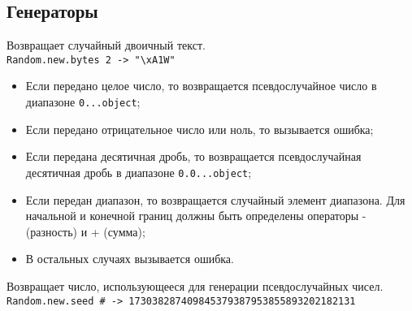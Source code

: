 \subsection*{Генераторы}

\begin{methodlist}
  Возвращает случайный двоичный текст. 
  \\\verb!Random.new.bytes 2 -> "\xA1W"!

  \begin{itemize}
    \item Если передано целое число, то возвращается псевдослучайное число в диапазоне \verb!0...object!;
    \item Если передано отрицательное число или ноль, то вызывается ошибка;
    \item Если передана десятичная дробь, то возвращается псевдослучайная десятичная дробь в диапазоне \verb!0.0...object!;
    \item Если передан диапазон, то возвращается случайный элемент диапазона. Для начальной и конечной границ должны быть определены операторы - (разность) и + (сумма);
    \item В остальных случаях вызывается ошибка.
  \end{itemize}   

  Возвращает число, использующееся для генерации псевдослучайных чисел. 
  \\\verb!Random.new.seed # -> 173038287409845379387953855893202182131!
\end{methodlist}
